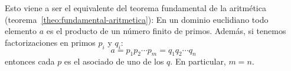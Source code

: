   Esto viene a ser el equivalente
  del teorema fundamental de la aritmética
  (teorema~\ref{theo:fundamental-aritmetica}):
  En un dominio euclidiano
  todo elemento \(a\) es el producto de un número finito de primos.
  Además,
  si tenemos factorizaciones en primos \(p_i\) y \(q_i\):
  \begin{equation*}
    a
      = p_1 p_2 \dotsm p_m
      = q_1 q_2 \dotsm q_n
  \end{equation*}
  entonces cada \(p\) es el asociado de uno de los \(q\).
  En particular,
  \(m = n\).

